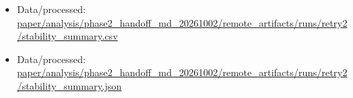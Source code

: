 \begin{itemize}[leftmargin=1.4em,noitemsep]
\item Data/processed: \begingroup\scriptsize\url{paper/analysis/phase2_handoff_md_20261002/remote_artifacts/runs/retry2/stability_summary.csv}\endgroup
\item Data/processed: \begingroup\scriptsize\url{paper/analysis/phase2_handoff_md_20261002/remote_artifacts/runs/retry2/stability_summary.json}\endgroup
\end{itemize}
